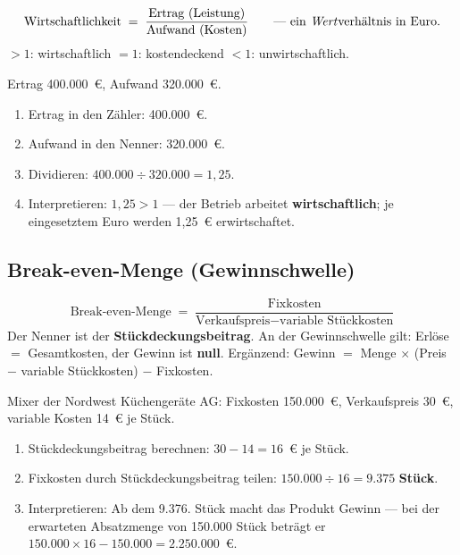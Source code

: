 \documentclass[11pt, a4paper]{article}
\begin{document}
\begin{merksatz}[title={\bfseries Formel: Wirtschaftlichkeit}]
\[
\text{Wirtschaftlichkeit} \;=\; \frac{\text{Ertrag (Leistung)}}{\text{Aufwand (Kosten)}}
\qquad \text{--- ein \emph{Wert}verhältnis in Euro.}
\]
$> 1$: wirtschaftlich \quad $= 1$: kostendeckend \quad $< 1$: unwirtschaftlich.
\end{merksatz}

\begin{beispiel}
Ertrag 400.000~€, Aufwand 320.000~€.
\begin{enumerate}
  \item Ertrag in den Zähler: 400.000~€.
  \item Aufwand in den Nenner: 320.000~€.
  \item Dividieren: $400.000 \div 320.000 = 1{,}25$.
  \item Interpretieren: $1{,}25 > 1$ --- der Betrieb arbeitet \textbf{wirtschaftlich};
    je eingesetztem Euro werden 1,25~€ erwirtschaftet.
\end{enumerate}
\end{beispiel}

\subsection{Break-even-Menge (Gewinnschwelle)}

\begin{merksatz}[title={\bfseries Formel: Break-even-Menge}]
\[
\text{Break-even-Menge} \;=\; \frac{\text{Fixkosten}}{\text{Verkaufspreis} - \text{variable Stückkosten}}
\]
Der Nenner ist der \textbf{Stückdeckungsbeitrag}. An der Gewinnschwelle gilt:
Erlöse $=$ Gesamtkosten, der Gewinn ist \textbf{null}. Ergänzend:
Gewinn $=$ Menge $\times$ (Preis $-$ variable Stückkosten) $-$ Fixkosten.
\end{merksatz}

\begin{beispiel}
Mixer der Nordwest Küchengeräte AG: Fixkosten 150.000~€, Verkaufspreis 30~€,
variable Kosten 14~€ je Stück.
\begin{enumerate}
  \item Stückdeckungsbeitrag berechnen: $30 - 14 = 16$~€ je Stück.
  \item Fixkosten durch Stückdeckungsbeitrag teilen:
    $150.000 \div 16 = 9.375$ \textbf{Stück}.
  \item Interpretieren: Ab dem 9.376. Stück macht das Produkt Gewinn --- bei der
    erwarteten Absatzmenge von 150.000 Stück beträgt er
    $150.000 \times 16 - 150.000 = 2.250.000$~€.
\end{enumerate}
\end{beispiel}
\end{document}
